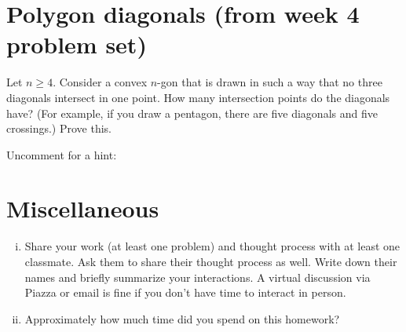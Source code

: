 \documentclass[10pt]{amsart}
\begin{document}
\section{Polygon diagonals (from week 4 problem set)}
Let $n\geq 4$. Consider a convex $n$-gon that is drawn in such a way that no three diagonals intersect in one point. How many intersection points do the diagonals have? (For example, if you draw a pentagon, there are five diagonals and five crossings.) Prove this. 

\noindent Uncomment for a hint:








\section{Miscellaneous}
\begin{enumerate}[i.]
    \item Share your work (at least one problem) and thought process with at least one classmate. Ask them to share their thought process as well. Write down their names and briefly summarize your interactions. A virtual discussion via Piazza or email is fine if you don't have time to interact in person. 
    \item Approximately how much time did you spend on this homework?
\end{enumerate}
\end{document}
